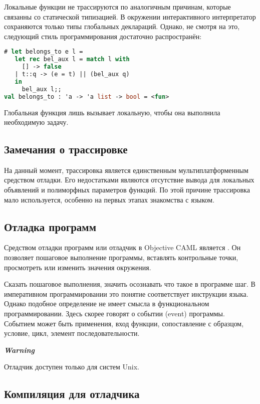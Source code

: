 Локальные функции не трассируются по аналогичным причинам, которые связанны со 
статической типизацией. В окружении интерактивного интерпретатор сохраняются 
только типы глобальных деклараций. Однако, не смотря на это, следующий стиль 
программирования достаточно распространён:

\begin{lstlisting}[language=Ocaml]
# let belongs_to e l = 
   let rec bel_aux l = match l with 
     [] -> false
   | t::q -> (e = t) || (bel_aux q)
   in 
     bel_aux l;;
val belongs_to : 'a -> 'a list -> bool = <fun>
\end{lstlisting}

Глобальная функция лишь вызывает локальную, чтобы она выполнила необходимую 
задачу.

\subsection {Замечания о трассировке}
\label{subsubsec:notes_on_tracing}

На данный момент, трассировка является единственным мультиплатформенным 
средством отладки. Его недостатками являются отсутствие вывода для локальных 
объявлений и полиморфных параметров функций. По этой причине трассировка мало 
используется, особенно на первых этапах знакомства с языком.

\subsection {Отладка программ}
\label{subsec:debug}

Средством отладки программ или отладчик в Objective CAML является 
. Он позволяет пошаговое выполнение программы, вставлять 
контрольные точки, просмотреть или изменить значения окружения.

Сказать пошаговое выполнения, значить осознавать что такое в программе шаг. В 
императивном программировании это понятие соответствует инструкции языка. Однако 
подобное определение не имеет смысла в функциональном программировании. Здесь 
скорее говорят о событии (event) программы. Событием может быть применения, вход 
функции, сопоставление с образцом, условие, цикл, элемент последовательности.

{\it \bf Warning}

Отладчик доступен только для систем Unix.

\subsection {Компиляция для отладчика}
\label{subsubsec:compiling_with_debugging_mode}

